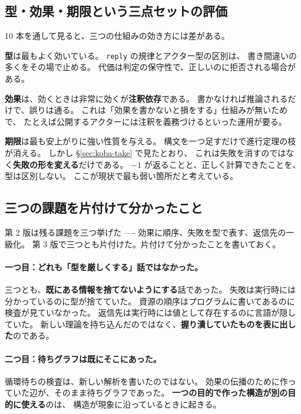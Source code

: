 \documentclass[11pt,a4paper]{ltjsarticle}
\theoremstyle{definition}
\theoremstyle{remark}
\begin{document}
\subsection{型・効果・期限という三点セットの評価}

10 本を通して見ると、三つの仕組みの効き方には差がある。

\textbf{型}は最もよく効いている。
\texttt{reply} の規律とアクター型の区別は、
書き間違いの多くをその場で止める。
代価は判定の保守性で、正しいのに拒否される場合がある。

\textbf{効果}は、効くときは非常に効くが\textbf{注釈依存}である。
書かなければ推論されるだけで、誤りは通る。
これは「効果を書かないと損をする」仕組みが無いためで、
たとえば公開するアクターには注釈を義務づけるといった運用が要る。

\textbf{期限}は最も安上がりに強い性質を与える。
構文を一つ足すだけで進行定理の枝が消える。
しかし \S\ref{sec:koba-take} で見たとおり、
これは失敗を消すのではなく\textbf{失敗の形を変える}だけである。
$-1$ が返ることと、正しく計算できたことを、型は区別しない。
ここが現状で最も弱い箇所だと考えている。

\subsection{三つの課題を片付けて分かったこと}

第 2 版は残る課題を三つ挙げた ---- 効果に順序、失敗を型で表す、返信先の一級化。
第 3 版で三つとも片付けた。片付けて分かったことを書いておく。

\paragraph{一つ目：どれも「型を厳しくする」話ではなかった。}
三つとも、\textbf{既にある情報を捨てないようにする}話であった。
失敗は実行時には分かっているのに型が捨てていた。
資源の順序はプログラムに書いてあるのに検査が見ていなかった。
返信先は実行時には値として存在するのに言語が隠していた。
新しい理論を持ち込んだのではなく、\textbf{握り潰していたものを表に出した}のである。

\paragraph{二つ目：待ちグラフは既にそこにあった。}
循環待ちの検査は、新しい解析を書いたのではない。
効果の伝播のために作っていた辺が、そのまま待ちグラフであった。
\textbf{一つの目的で作った構造が別の目的に使える}のは、
構造が現象に沿っているときに起きる。
\end{document}
